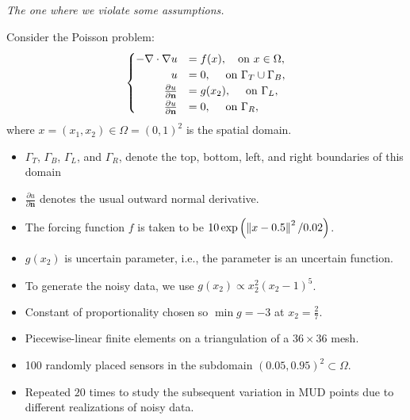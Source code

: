 \begin{frame}[t]{\it The one where we violate some assumptions.}

Consider the Poisson problem:
\begin{equation}\label{eq:pde-equation}
\begin{cases}
\hfill -\nabla \cdot \nabla u &= f(x), \quad\text{on } x\in \Omega, \\
\hfill u &= 0, \quad\text{ on } \Gamma_T \cup \Gamma_B, \\
\hfill \frac{\partial u}{\partial \mathbf{n}} &= g(x_2), \quad\text{ on } \Gamma_L, \\
\hfill \frac{\partial u}{\partial \mathbf{n}} &= 0, \quad\text{ on } \Gamma_R,
\end{cases}
\end{equation}
where $x=(x_1, x_2) \in \Omega = (0,1)^2$ is the spatial domain.

\begin{itemize}
\item $\Gamma_T$, $\Gamma_B$, $\Gamma_L$, and $\Gamma_R$, denote the top, bottom, left, and right boundaries of this domain
\item $\frac{\partial u}{\partial \mathbf{n}}$ denotes the usual outward normal derivative.
\item The forcing function $f$ is taken to be $10\exp\left ( \left\Vert x - 0.5\right\Vert^2 / 0.02 \right )$.
\end{itemize}

\end{frame}


\begin{frame}

\begin{itemize}

\item $g(x_2)$ is uncertain parameter, i.e., the parameter is an uncertain function.
\bigskip
\item To generate the noisy data, we use $g(x_2)\propto x_2^2(x_2-1)^5$.
\bigskip
\item Constant of proportionality chosen so $\min{g}=-3$ at $x_2=\frac{2}{7}$.
\bigskip
\item Piecewise-linear finite elements on a triangulation of a $36\times36$ mesh.
\bigskip
\item 100 randomly placed sensors in the subdomain $(0.05, 0.95)^2 \subset \Omega$.
\bigskip
\item Repeated $20$ times to study the subsequent variation in MUD points due to different realizations of noisy data.
\bigskip
\end{itemize}

\end{frame}



